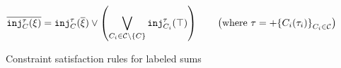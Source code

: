 
\begin{figure}[ht]

  \begin{mathpar}
  \end{mathpar}


  \begin{align*}
    \cdual{\cinj{C}{\tau}{\xi}} & = \cinj{C}{\tau}{\cdual{\xi}} \vee \left(
    \bigvee_{C_i \in \tagset \setminus \{C\}} \cinj{C_i}{\tau}{\ctruth}
    \right)
    \qquad \left(\text{where }\tau = \tlabeledsum{C_i(\tau_i)}_{C_i \in \tagset}\right)
  \end{align*}


  \begin{mathpar}
  \end{mathpar}


  \begin{mathpar}
  \end{mathpar}


  \begin{mathpar}

  \end{mathpar}

  \caption{Constraint satisfaction rules for labeled sums}
  \label{fig:labeled-sums-constraint-rules}
\end{figure}
